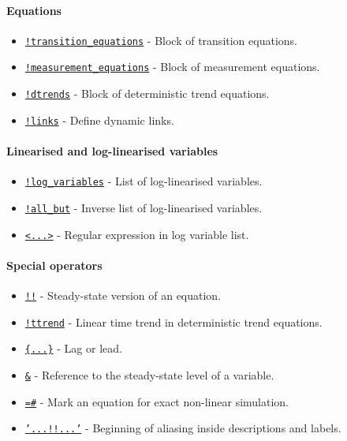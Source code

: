 \paragraph{Equations}

\begin{itemize}
\itemsep1pt\parskip0pt
\item
  \href{modellang/transitionequations}{\texttt{!transition\_equations}}
  - Block of transition equations.
\item
  \href{modellang/measurementequations}{\texttt{!measurement\_equations}}
  - Block of measurement equations.
\item
  \href{modellang/dtrends}{\texttt{!dtrends}} - Block of deterministic
  trend equations.
\item
  \href{modellang/links}{\texttt{!links}} - Define dynamic links.
\end{itemize}

\paragraph{Linearised and log-linearised
variables}

\begin{itemize}
\itemsep1pt\parskip0pt
\item
  \href{modellang/logvariables}{\texttt{!log\_variables}} - List of
  log-linearised variables.
\item
  \href{modellang/allbut}{\texttt{!all\_but}} - Inverse list of
  log-linearised variables.
\item
  \href{modellang/regexpression}{\texttt{\textless{}...\textgreater{}}}
  - Regular expression in log variable list.
\end{itemize}

\paragraph{Special operators}

\begin{itemize}
\itemsep1pt\parskip0pt
\item
  \href{modellang/sstateversion}{\texttt{!!}} - Steady-state version of
  an equation.
\item
  \href{modellang/ttrend}{\texttt{!ttrend}} - Linear time trend in
  deterministic trend equations.
\item
  \href{modellang/laglead}{\texttt{\{...\}}} - Lag or lead.
\item
  \href{modellang/sstateref}{\texttt{\&}} - Reference to the
  steady-state level of a variable.
\item
  \href{modellang/exactnonlin}{\texttt{=\#}} - Mark an equation for
  exact non-linear simulation.
\item
  \href{modellang/alias}{\texttt{'...!!...'}} - Beginning of aliasing
  inside descriptions and labels.
\end{itemize}

